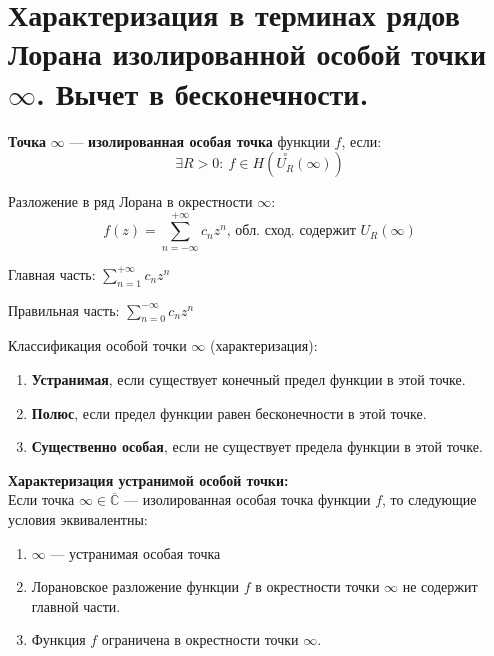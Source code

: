 \newpage
\section{Характеризация в терминах рядов Лорана изолированной особой точки $\infty$. Вычет в бесконечности.}


\textbf{Точка }$\mathbf{\infty}$ --- \textbf{изолированная особая точка} функции $f$, если:
$$\exists R > 0: \ f\in H(\overset{\circ}{U_{R}}(\infty))$$

Разложение в ряд Лорана в окрестности $\infty$:
$$f(z)=\sum_{n=-\infty}^{+\infty} c_n z^n\text{, обл. сход. содержит } U_R(\infty)$$

Главная часть: $\sum_{n=1}^{+\infty} c_n z^n$

Правильная часть: $\sum_{n=0}^{-\infty} c_n z^n$

Классификация особой точки $\infty$ (характеризация):
\begin{enumerate}
    \item \textbf{Устранимая}, если существует конечный  предел функции в этой точке.
    \item \textbf{Полюс}, если предел функции равен бесконечности в этой точке.
    \item \textbf{Существенно особая}, если не существует предела функции в этой точке.
\end{enumerate}

\textbf{Характеризация устранимой особой точки:}\\
Если точка $\infty \in \overline{\mathbb{C}}$ --- изолированная особая точка функции $f$, то следующие условия эквивалентны:
\begin{enumerate}
    \item $\infty$ --- устранимая особая точка
    \item Лорановское разложение функции $f$ в окрестности точки $\infty$ не содержит главной части. 
    \item Функция $f$ ограничена в окрестности точки $\infty$.
\end{enumerate}

